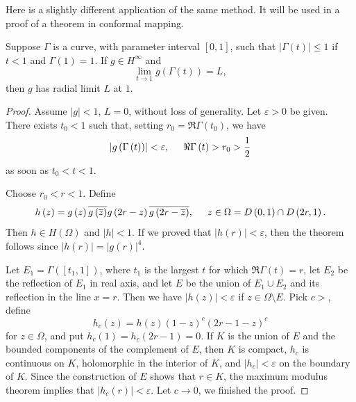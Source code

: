 Here is a slightly different application of the same method. It will be used in a proof of a theorem in conformal mapping.
\begin{theorem}
Suppose $\Gamma$ is a curve, with parameter interval $[0,1]$, such that $|\Gamma(t)|\le 1$ if $t<1$ and $\Gamma(1)=1$. If $g\in H^\infty$ and 
$$
\lim_{t\to 1}g(\Gamma(t))=L,
$$
then $g$ has radial limit $L$ at $1$.
\end{theorem}
\begin{proof}
Assume $|g|<1$, $L=0$, without loss of generality. Let $\varepsilon>0$ be given. There exists $t_0<1$ such that, setting $r_0=\Re\Gamma(t_0)$, we have 
$$
\left| g\left( \Gamma \left( t \right) \right) \right|<\varepsilon ,\hspace{0.5cm}\Re \Gamma \left( t \right) >r_0>\frac{1}{2}
$$
as soon as $t_0<t<1$.\par
Choose $r_0<r<1$. Define 
$$
h\left( z \right) =g\left( z \right) \overline{g\left( \overline{z} \right) }g\left( 2r-z \right) \overline{g\left( 2r-\overline{z} \right) },\hspace{0.5cm}z\in \Omega = D\left( 0,1 \right) \cap D\left( 2r,1 \right) .
$$
Then $h\in H(\Omega)$ and $|h|<1$. If we proved that $|h(r)|<\varepsilon$, then the theorem follows since $|h(r)|=|g(r)|^4$.\par
Let $E_1=\Gamma([t_1,1])$, where $t_1$ is the largest $t$ for which $\Re\Gamma(t)=r$, let $E_2$ be the reflection of $E_1$ in real axis, and let $E$ be the union of $E_1\cup E_2$ and its reflection in the line $x=r$. Then we have $|h(z)|<\varepsilon$ if $z\in\Omega\setminus E$. Pick $c>$, define 
$$
h_c\left( z \right) =h\left( z \right) \left( 1-z \right) ^c\left( 2r-1-z \right) ^c
$$
for $z\in\Omega$, and put $h_c(1)=h_c(2r-1)=0$. If $K$ is the union of $E$ and the bounded components of the complement of $E$, then $K$ is compact, $h_c$ is continuous on $K$, holomorphic in the interior of $K$, and $|h_c|<\varepsilon$ on the boundary of $K$. Since the construction of $E$ shows that $r\in K$, the maximum modulus theorem implies that $|h_c(r)|<\varepsilon$. Let $c\to 0$, we finished the proof.
\end{proof}
